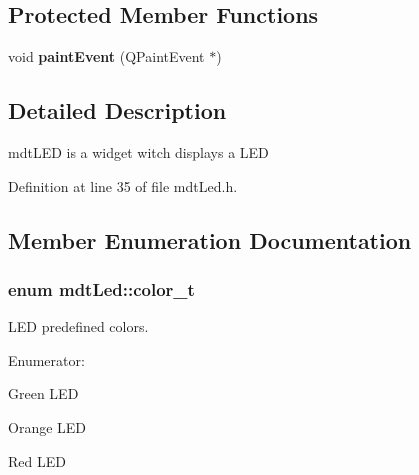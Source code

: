 \subsection*{Protected Member Functions}
\begin{DoxyCompactItemize}
\item 
\hypertarget{classmdt_led_a1c96c8e06658ba569f7cf6b3fc3f5903}{
void {\bfseries paintEvent} (QPaintEvent $\ast$)}
\label{classmdt_led_a1c96c8e06658ba569f7cf6b3fc3f5903}

\end{DoxyCompactItemize}


\subsection{Detailed Description}
mdtLED is a widget witch displays a LED 



Definition at line 35 of file mdtLed.h.



\subsection{Member Enumeration Documentation}
\hypertarget{classmdt_led_a2d57d9ef04d2105d2fad93b57fc7cfef}{
\subsubsection[{color\_\-t}]{\setlength{\rightskip}{0pt plus 5cm}enum {\bf mdtLed::color\_\-t}}}
\label{classmdt_led_a2d57d9ef04d2105d2fad93b57fc7cfef}


LED predefined colors. 

\begin{Desc}
\item[Enumerator: ]\par
\begin{description}
\item[{\em 
\hypertarget{classmdt_led_a2d57d9ef04d2105d2fad93b57fc7cfefa45b61a84d67fbd6379dee70b59193415}{
Green}
\label{classmdt_led_a2d57d9ef04d2105d2fad93b57fc7cfefa45b61a84d67fbd6379dee70b59193415}
}]Green LED \item[{\em 
\hypertarget{classmdt_led_a2d57d9ef04d2105d2fad93b57fc7cfefa5dc598374ab643ab42ea786bc7fe4a04}{
Orange}
\label{classmdt_led_a2d57d9ef04d2105d2fad93b57fc7cfefa5dc598374ab643ab42ea786bc7fe4a04}
}]Orange LED \item[{\em 
\hypertarget{classmdt_led_a2d57d9ef04d2105d2fad93b57fc7cfefab889f9da8e6cf657379cb521c3d11406}{
Red}
\label{classmdt_led_a2d57d9ef04d2105d2fad93b57fc7cfefab889f9da8e6cf657379cb521c3d11406}
}]Red LED \end{description}
\end{Desc}



